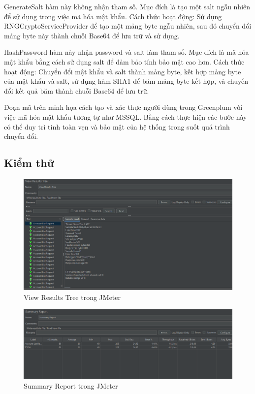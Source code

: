 \documentclass[14pt]{article}
\begin{document}
GenerateSalt hàm này không nhận tham số. Mục đích là tạo một salt ngẫu nhiên để sử dụng trong việc mã hóa mật khẩu. Cách thức hoạt động: Sử dụng RNGCryptoServiceProvider để tạo một mảng byte ngẫu nhiên, sau đó chuyển đổi mảng byte này thành chuỗi Base64 để lưu trữ và sử dụng.


HashPassword hàm này nhận password và salt làm tham số. Mục đích là mã hóa mật khẩu bằng cách sử dụng salt để đảm bảo tính bảo mật cao hơn. Cách thức hoạt động: Chuyển đổi mật khẩu và salt thành mảng byte, kết hợp mảng byte của mật khẩu và salt, sử dụng hàm SHA1 để băm mảng byte kết hợp, và chuyển đổi kết quả băm thành chuỗi Base64 để lưu trữ.

Đoạn mã trên minh họa cách tạo và xác thực người dùng trong Greenplum với việc mã hóa mật khẩu tương tự như MSSQL. Bằng cách thực hiện các bước này có thể duy trì tính toàn vẹn và bảo mật của hệ thống trong suốt quá trình chuyển đổi.

\subsection{Kiểm thử}


\begin{figure}
    \centering
    \includegraphics[width=0.8\linewidth]{images/vrt.png}
    \caption{View Results Tree trong JMeter}
    \label{fig:vrt}
\end{figure}

\begin{figure}
    \centering
    \includegraphics[width=0.8\linewidth]{images/sr.png}
     \caption{Summary Report trong JMeter}
    \label{fig:sr}
\end{figure}
\end{document}

